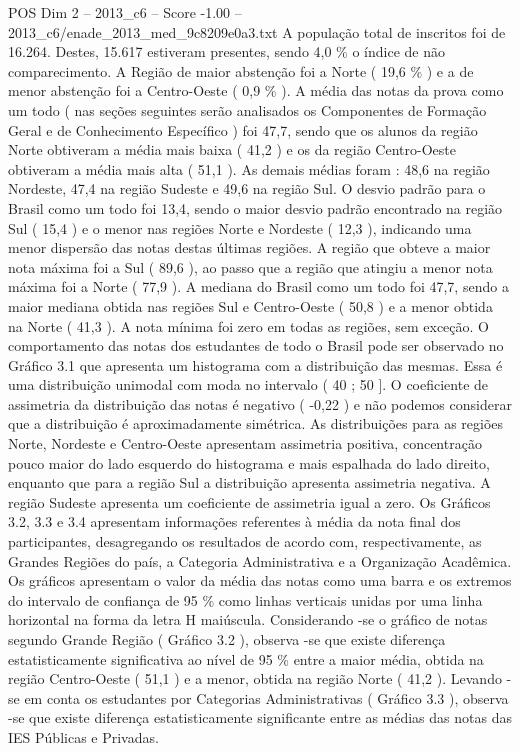 \begin{textsample}{POS Dim 2 – 2013\_c6 – Score -1.00 – 2013\_c6/enade\_2013\_med\_9c8209e0a3.txt}
A população total de inscritos foi de 16.264.
Destes, 15.617 estiveram presentes, sendo 4,0 \% o índice de não comparecimento.
A Região de maior abstenção foi a Norte ( 19,6 \% ) e a de menor abstenção foi a Centro-Oeste ( 0,9 \% ).
A média das notas da prova como um todo ( nas seções seguintes serão analisados os Componentes de Formação Geral e de Conhecimento Específico ) foi 47,7, sendo que os alunos da região Norte obtiveram a média mais baixa ( 41,2 ) e os da região Centro-Oeste obtiveram a média mais alta ( 51,1 ).
As demais médias foram : 48,6 na região Nordeste, 47,4 na região Sudeste e 49,6 na região Sul.
O desvio padrão para o Brasil como um todo foi 13,4, sendo o maior desvio padrão encontrado na região Sul ( 15,4 ) e o menor nas regiões Norte e Nordeste ( 12,3 ), indicando uma menor dispersão das notas destas últimas regiões.
A região que obteve a maior nota máxima foi a Sul ( 89,6 ), ao passo que a região que atingiu a menor nota máxima foi a Norte ( 77,9 ).
A mediana do Brasil como um todo foi 47,7, sendo a maior mediana obtida nas regiões Sul e Centro-Oeste ( 50,8 ) e a menor obtida na Norte ( 41,3 ).
A nota mínima foi zero em todas as regiões, sem exceção.
O comportamento das notas dos estudantes de todo o Brasil pode ser observado no Gráfico 3.1 que apresenta um histograma com a distribuição das mesmas.
Essa é uma distribuição unimodal com moda no intervalo ( 40 ; 50 ].
O coeficiente de assimetria da distribuição das notas é negativo ( -0,22 ) e não podemos considerar que a distribuição é aproximadamente simétrica.
As distribuições para as regiões Norte, Nordeste e Centro-Oeste apresentam assimetria positiva, concentração pouco maior do lado esquerdo do histograma e mais espalhada do lado direito, enquanto que para a região Sul a distribuição apresenta assimetria negativa.
A região Sudeste apresenta um coeficiente de assimetria igual a zero.
Os Gráficos 3.2, 3.3 e 3.4 apresentam informações referentes à média da nota final dos participantes, desagregando os resultados de acordo com, respectivamente, as Grandes Regiões do país, a Categoria Administrativa e a Organização Acadêmica.
Os gráficos apresentam o valor da média das notas como uma barra e os extremos do intervalo de confiança de 95 \% como linhas verticais unidas por uma linha horizontal na forma da letra H maiúscula.
Considerando -se o gráfico de notas segundo Grande Região ( Gráfico 3.2 ), observa -se que existe diferença estatisticamente significativa ao nível de 95 \% entre a maior média, obtida na região Centro-Oeste ( 51,1 ) e a menor, obtida na região Norte ( 41,2 ).
Levando -se em conta os estudantes por Categorias Administrativas ( Gráfico 3.3 ), observa -se que existe diferença estatisticamente significante entre as médias das notas das IES Públicas e Privadas.

\end{textsample}

